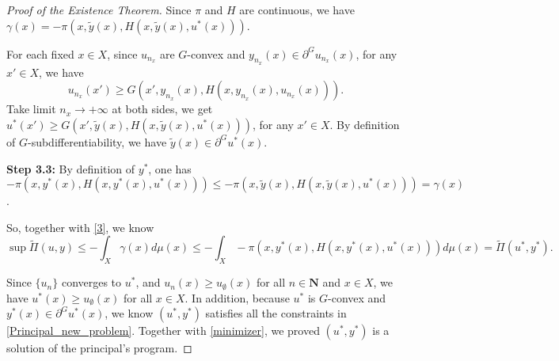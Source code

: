 \documentclass[a4paper, 11pt]{amsart}
\numberwithin{equation}{section}
\theoremstyle{plain}
\theoremstyle{definition}
\theoremstyle{remark}
\newcommand{\N}{\mathbf{N}}
\begin{document}
\begin{proof}[Proof of the Existence Theorem]
	Since $\pi$ and $H$ are continuous, we have $ \gamma(x)= - \pi(x, \tilde{y}(x), H(x,\tilde{y}(x),u^*(x)))$.\medskip
	
	For each fixed $x\in X$, since $u_{n_x}$ are $G$-convex and $y_{n_x}(x) \in \partial^G u_{n_x}(x)$, for any $x' \in X$, we have $$u_{n_x}(x')\ge G(x', y_{n_x}(x),H(x,y_{n_x}(x),u_{n_x}(x))).$$ 
	Take limit $n_x \longrightarrow +\infty$ at both sides, we get $u^*(x')\ge G(x', \tilde{y}(x),H(x,\tilde{y}(x),u^*(x)))$, for any $x'\in X$. By definition of $G$-subdifferentiability, we have $\tilde{y}(x)\in \partial^Gu^*(x)$. \medskip





{\bf Step 3.3: } By definition of $y^*$, one has $$ -\pi(x, y^*(x), H(x,y^*(x),u^*(x)))\le   -\pi(x, \tilde{y}(x), H(x,\tilde{y}(x),u^*(x))) = \gamma(x)$$.
	
So, together with \eqref{3}, we know 
\begin{equation}\label{minimizer}
	\sup \tilde{\Pi}(u,y) \le - \int_{X}  \gamma(x) d\mu(x) \le - \int_{X}  - \pi(x, y^*(x), H(x,y^*(x),u^*(x))) d\mu(x) = \tilde{\Pi}(u^*,y^*).
\end{equation}


Since $\{u_n\}$ converges to $u^*$, and $u_n(x)\ge u_{\emptyset}(x)$ for all $n\in \N$ and $x \in X$, we have $u^*(x)\ge u_{\emptyset}(x)$ for all $x \in X$. In addition, because $u^*$ is $G$-convex and $y^*(x) \in \partial^G u^*(x)$, we know $(u^*, y^*)$ satisfies all the constraints in \eqref{Principal_new_problem}. Together with \eqref{minimizer}, we proved $(u^*,y^*)$ is a solution of the principal's program.
\end{proof}



\bigskip











\end{document}
